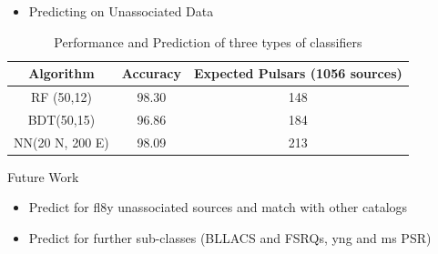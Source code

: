 \documentclass{beamer}
\begin{document}
\begin{frame}
\begin{itemize}
\item Predicting on Unassociated Data
\end{itemize}
\begin{table}[!h]
    \centering
    
    \begin{tabular}{|c|c|c|}
    \hline
    Algorithm&Accuracy& Expected Pulsars (1056 sources)\\
     \hline
    RF (50,12) & 98.30&148\\
    \hline %
    BDT(50,15)& 96.86&184 \\
    \hline
    NN(20 N, 200 E) &98.09& 213\\
    \hline
     
    \end{tabular}

    \caption{Performance and Prediction of three types of classifiers}
    \label{tab:my_label}
\end{table}{}
\end{frame}
\begin{frame}{Future Work}

  \begin{itemize}
  \item
    Predict for fl8y unassociated sources and match with other catalogs
  \item
  Predict for further sub-classes (BLLACS and FSRQs, yng and ms PSR)
   
  \end{itemize}
  
\end{frame}
\end{document}
